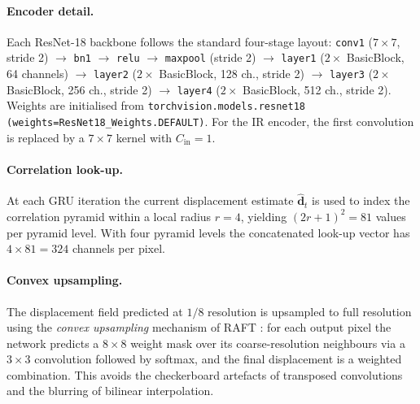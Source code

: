 \paragraph{Encoder detail.}
Each ResNet-18 backbone follows the standard four-stage layout:
\texttt{conv1} ($7 \times 7$, stride 2) $\rightarrow$ \texttt{bn1}
$\rightarrow$ \texttt{relu} $\rightarrow$ \texttt{maxpool} (stride 2)
$\rightarrow$ \texttt{layer1} ($2 \times$ BasicBlock, 64 channels)
$\rightarrow$ \texttt{layer2} ($2 \times$ BasicBlock, 128 ch., stride 2)
$\rightarrow$ \texttt{layer3} ($2 \times$ BasicBlock, 256 ch., stride 2)
$\rightarrow$ \texttt{layer4} ($2 \times$ BasicBlock, 512 ch., stride 2).
Weights are initialised from \texttt{torchvision.models.resnet18
(weights=ResNet18\_Weights.DEFAULT)}.  For the IR encoder, the first
convolution is replaced by a $7 \times 7$ kernel with $C_{\text{in}}{=}1$.

\paragraph{Correlation look-up.}
At each GRU iteration the current displacement estimate
$\hat{\mathbf{d}}_t$ is used to index the correlation pyramid within a
local radius $r{=}4$, yielding $(2r+1)^2 = 81$ values per pyramid level.
With four pyramid levels the concatenated look-up vector has
$4 \times 81 = 324$ channels per pixel.

\paragraph{Convex upsampling.}
The displacement field predicted at $1/8$ resolution is upsampled to full
resolution using the \emph{convex upsampling} mechanism of RAFT
\cite{teed2020raft}: for each output pixel the network predicts a
$8 \times 8$ weight mask over its coarse-resolution neighbours via a
$3 \times 3$ convolution followed by softmax, and the final displacement
is a weighted combination.  This avoids the checkerboard artefacts of
transposed convolutions and the blurring of bilinear interpolation.

